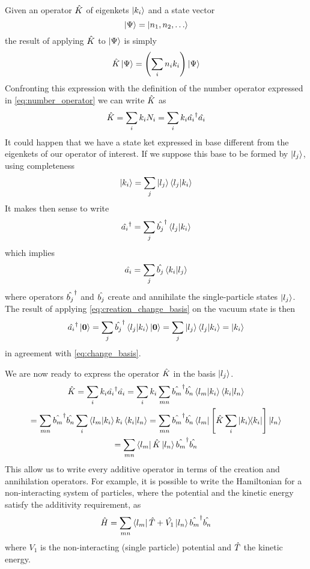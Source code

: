 Given an operator $\hat{K}$ of eigenkets $\ket{k_i}$ and a state vector
\begin{equation}
    \ket{\Psi} = \ket{n_1, n_2, \dots}
\end{equation}
the result of applying $\hat{K}$ to $\ket{\Psi}$ is simply
\begin{equation}
    \hat{K}\ket{\Psi} = \left( \sum_i n_i k_i \right) \ket{\Psi}
\end{equation}
Confronting this expression with the definition of the number operator expressed in \cref{eq:number_operator} we can write $\hat{K}$ as
\begin{equation}
    \hat{K} = \sum_i k_i N_i = \sum_i k_i  \hat{a_i}^\dagger\hat{a_i}
\end{equation}
It could happen that we have a state ket expressed in base different from the eigenkets of our operator of interest. If we suppose this base to be formed by $\ket{l_j}$, using completeness
\begin{equation} \label{eq:change_basis}
    \ket{k_i} = \sum_j \ket{l_j} \braket{l_j}{k_i}
\end{equation}
It makes then sense to write
\begin{equation} \label{eq:creation_change_basis}
    \hat{a_i}^\dagger = \sum_j \hat{b_j}^\dagger \braket{l_j}{k_i}
\end{equation}
which implies
\begin{equation}
    \hat{a_i} = \sum_j \hat{b_j} \braket{k_i}{l_j}
\end{equation}
where operators $\hat{b_j}^\dagger$ and $\hat{b_j}$ create and annihilate the single-particle states $\ket{l_j}$. The result of applying \cref{eq:creation_change_basis} on the vacuum state is then
\begin{equation}
    \hat{a_i}^\dagger \ket{\mathbf{\boldsymbol{0}}} = \sum_j \hat{b_j}^\dagger \braket{l_j}{k_i} \ket{\mathbf{\boldsymbol{0}}} = \sum_j \ket{l_j} \braket{l_j}{k_i} = \ket{k_i}
\end{equation}
in agreement with \cref{eq:change_basis}.

We are now ready to express the operator $\hat{K}$ in the basis $\ket{l_j}$.
\begin{multline}
    \hat{K} =  \sum_i k_i  \hat{a_i}^\dagger\hat{a_i}
    = \sum_i k_i \sum_{mn} \hat{b_m}^\dagger\hat{b_n} \braket{l_m}{k_i}\braket{k_i}{l_n}
    \\ = \sum_{mn} \hat{b_m}^\dagger\hat{b_n} \sum_i \braket{l_m}{k_i} k_i \braket{k_i}{l_n}
    = \sum_{mn} \hat{b_m}^\dagger\hat{b_n} \bra{l_m} \left[ \hat{K} \sum_i \op{k_i} \right] \ket{l_n}
    \\= \sum_{mn}  \bra{l_m}\hat{K}\ket{l_n} \hat{b_m}^\dagger\hat{b_n}
\end{multline}
This allow us to write every additive operator in terms of the creation and annihilation operators. For example, it is possible to write the Hamiltonian for a non-interacting system of particles, where the potential and the kinetic energy satisfy the additivity requirement, as
\begin{equation} \label{eq:second_quantization}
    \hat{H} = \sum_{mn} \bra{l_m}\hat{T}+\hat{V_1}\ket{l_n} \hat{b_m}^\dagger\hat{b_n}
\end{equation}
where $V_1$ is the non-interacting (single particle) potential and $\hat{T}$ the kinetic energy.